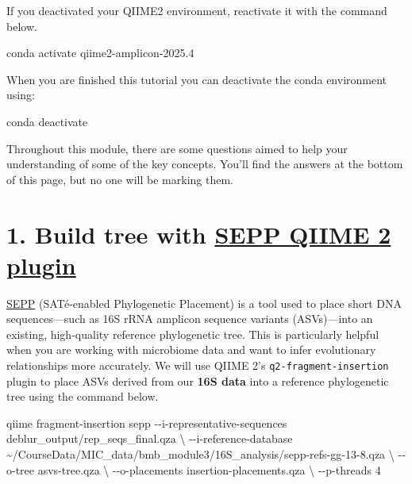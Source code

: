 \documentclass[
]{book}
\newenvironment{Shaded}{\begin{snugshade}}{\end{snugshade}}
\newcommand{\AttributeTok}[1]{\textcolor[rgb]{0.13,0.29,0.53}{#1}}
\newcommand{\DataTypeTok}[1]{\textcolor[rgb]{0.13,0.29,0.53}{#1}}
\newcommand{\ExtensionTok}[1]{#1}
\newcommand{\NormalTok}[1]{#1}
\begin{document}
If you deactivated your QIIME2 environment, reactivate it with the command below.

\begin{Shaded}
\begin{Highlighting}[]
\ExtensionTok{conda}\NormalTok{ activate qiime2{-}amplicon{-}2025.4}
\end{Highlighting}
\end{Shaded}

When you are finished this tutorial you can deactivate the conda environment using:

\begin{Shaded}
\begin{Highlighting}[]
\ExtensionTok{conda}\NormalTok{ deactivate}
\end{Highlighting}
\end{Shaded}

Throughout this module, there are some questions aimed to help your understanding of some of the key concepts. You'll find the answers at the bottom of this page, but no one will be marking them.

\section{\texorpdfstring{1. Build tree with \protect\hypertarget{build-tree}{}\href{https://amplicon-docs.qiime2.org/en/latest/references/plugins/fragment-insertion.html\#q2-plugin-fragment-insertion}{SEPP QIIME 2 plugin}}{1. Build tree with SEPP QIIME 2 plugin}}\label{build-tree-with-sepp-qiime-2-plugin}

\href{https://www.ncbi.nlm.nih.gov/pmc/articles/PMC5904434/}{SEPP} (SATé-enabled Phylogenetic Placement) is a tool used to place short DNA sequences---such as 16S rRNA amplicon sequence variants (ASVs)---into an existing, high-quality reference phylogenetic tree. This is particularly helpful when you are working with microbiome data and want to infer evolutionary relationships more accurately. We will use QIIME 2's \texttt{q2-fragment-insertion} plugin to place ASVs derived from our \textbf{16S data} into a reference phylogenetic tree using the command below.

\begin{Shaded}
\begin{Highlighting}[]
\ExtensionTok{qiime}\NormalTok{ fragment{-}insertion sepp}
  \ExtensionTok{{-}{-}i{-}representative{-}sequences}\NormalTok{ deblur\_output/rep\_seqs\_final.qza }\DataTypeTok{\textbackslash{}}
  \AttributeTok{{-}{-}i{-}reference{-}database}\NormalTok{ \textasciitilde{}/CourseData/MIC\_data/bmb\_module3/16S\_analysis/sepp{-}refs{-}gg{-}13{-}8.qza }\DataTypeTok{\textbackslash{}}
  \AttributeTok{{-}{-}o{-}tree}\NormalTok{ asvs{-}tree.qza }\DataTypeTok{\textbackslash{}}
  \AttributeTok{{-}{-}o{-}placements}\NormalTok{ insertion{-}placements.qza }\DataTypeTok{\textbackslash{}}
  \AttributeTok{{-}{-}p{-}threads}\NormalTok{ 4}
\end{Highlighting}
\end{Shaded}
\end{document}

